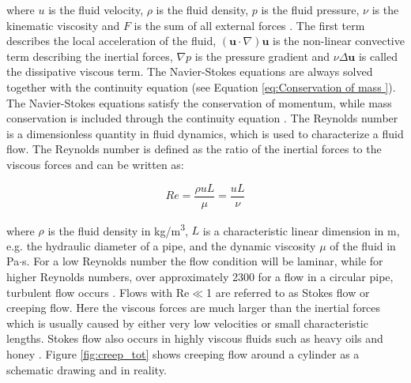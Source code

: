where $u$ is the fluid velocity, $\rho$ is the fluid density, $p$ is the fluid pressure, $\nu$ is the kinematic viscosity and $F$ is the sum of all external forces \cite{versteeg2007introduction}. The first term describes the local acceleration of the fluid, $({\boldsymbol u} \cdot \nabla) {\boldsymbol u}$ is the non-linear convective term describing the inertial forces, $\nabla p$ is the pressure gradient and $\nu\Delta{\boldsymbol u}$ is called the dissipative viscous term. The Navier-Stokes equations are always solved together with the continuity equation (see Equation \ref{eq:Conservation of mass }). The Navier-Stokes equations satisfy the conservation of momentum, while mass conservation is included through the continuity equation \cite{alkahtani2013numerical}. The Reynolds number is a dimensionless quantity in fluid dynamics, which is used to characterize a fluid flow. The Reynolds number is defined as the ratio of the inertial forces to the viscous forces and can be written as:  

\begin{equation}
Re=\frac{\rho u L}{\mu}=\frac{uL}{\nu}
\label{eq:Reynolds}
\end{equation}

where $\rho$ is the fluid density in kg/m\textsuperscript{3}, $L$ is a characteristic linear dimension in m, e.g. the hydraulic diameter of a pipe, and the dynamic viscosity $\mu$ of the fluid in Pa$\cdotp$s. For a low Reynolds number the flow condition will be laminar, while for higher Reynolds numbers, over approximately 2300 for a flow in a circular pipe, turbulent flow occurs \cite{schwarze2012cfd}. Flows with Re$\ll$1 are referred to as Stokes flow or creeping flow. Here the viscous forces are much larger than the inertial forces which is usually caused by either very low velocities or small characteristic lengths. Stokes flow also occurs in highly viscous fluids such as heavy oils and honey \cite{lautrup2004physics}. Figure \ref{fig:creep_tot} shows creeping flow around a cylinder as a schematic drawing and in reality. 

